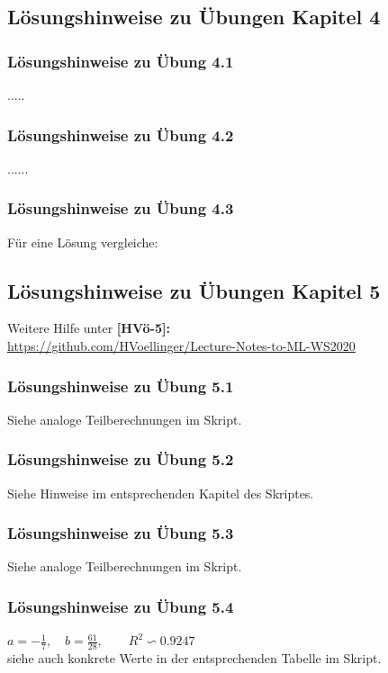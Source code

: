 \documentclass[12pt]{article}
\begin{document}
\newpage

\subsection{Lösungshinweise zu Übungen Kapitel 4}

\subsubsection{Lösungshinweise zu Übung 4.1}
.....\\
\subsubsection{Lösungshinweise zu Übung 4.2}
......\\
\subsubsection{Lösungshinweise zu Übung 4.3}

Für eine Lösung vergleiche:\\

\newpage

\subsection{Lösungshinweise zu Übungen Kapitel 5}
%
\hspace*{1.0cm} Weitere Hilfe unter \textbf{[HVö-5]:}\\
\url{https://github.com/HVoellinger/Lecture-Notes-to-ML-WS2020}
%
\subsubsection{Lösungshinweise zu Übung 5.1}
%
Siehe analoge Teilberechnungen im Skript.
%
\subsubsection{Lösungshinweise zu Übung 5.2}
%
Siehe Hinweise im entsprechenden Kapitel des Skriptes.  
%
\subsubsection{Lösungshinweise zu Übung 5.3}
%
Siehe analoge Teilberechnungen im Skript.
%
\subsubsection{Lösungshinweise zu Übung 5.4}
%
$ a = - \frac{1}{7}, \quad b =  \frac{61}{28}, \qquad R^2 \backsim 0.9247 $\\[0.2cm]
siehe auch konkrete Werte in der entsprechenden Tabelle im Skript.
%
\end{document}
